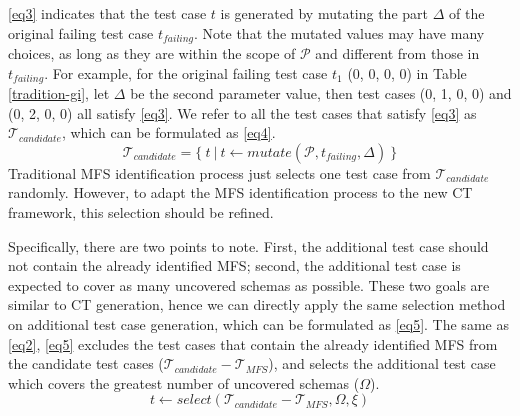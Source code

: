 \documentclass[10pt,journal,compsoc]{IEEEtran}
\begin{document}
\ref{eq3} indicates that the test case $t$ is generated by mutating the part $\Delta$ of the original failing test case $t_{failing}$. Note that the mutated values may have many choices, as long as they are within the scope of $\mathcal{P}$ and different from those in $t_{failing}$. For example, for the original failing test case $t_{1}$ (0, 0, 0, 0) in Table \ref{tradition-gi}, let $\Delta$ be the second parameter value, then test cases (0, 1, 0, 0) and (0, 2, 0, 0) all satisfy \ref{eq3}. We refer to all the test cases that satisfy \ref{eq3} as $\mathcal{T}_{candidate}$, which can be formulated  as   \ref{eq4}.
\begin{displaymath}\mathcal{T}_{candidate} =  \{\ t\ |\ t \leftarrow  mutate (\mathcal{P}, t_{failing}, \Delta )\ \} \tag{EQ4} \label{eq4} \end{displaymath}
Traditional MFS identification process just selects one test case from $\mathcal{T}_{candidate}$ randomly. However, to adapt the MFS identification process to the new CT framework, this selection should be refined.

Specifically, there are two points to note. First, the additional test case should not contain the already identified MFS; second, the additional test case is expected to cover as many uncovered schemas as possible. These two goals are similar to CT generation, hence we can directly apply the same selection method on additional test case generation, which can be formulated as \ref{eq5}.  The same as \ref{eq2}, \ref{eq5} excludes the test cases that contain the already identified MFS from the candidate test cases ($\mathcal{T}_{candidate} - \mathcal{T}_{MFS}$), and selects the additional test case which covers the greatest number of uncovered schemas ($\Omega$).
\begin{displaymath}t \leftarrow  select (\mathcal{T}_{candidate} - \mathcal{T}_{MFS}, \Omega ,  \xi )  \tag{EQ5} \label{eq5} \end{displaymath}





\end{document}
